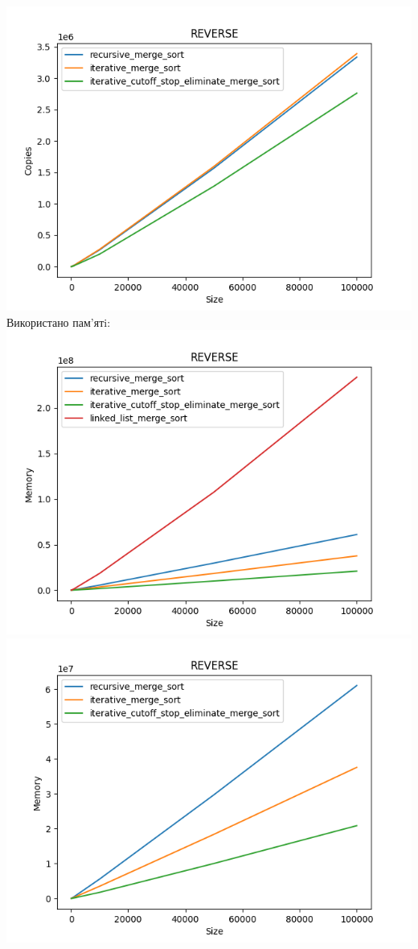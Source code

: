 \documentclass{article}
\begin{document}
        \includegraphics[scale=0.5]{reverse_Copies_3_sorts_6_numbers_50_100to100000.png}
    \newline
    Використано пам’ятi:
    \newline
        \includegraphics[scale=0.5]{reverse_Memory_4_sorts_6_numbers_50_100to100000.png}
        \includegraphics[scale=0.5]{reverse_Memory_3_sorts_6_numbers_50_100to100000.png}
    \newpage
\end{document}
